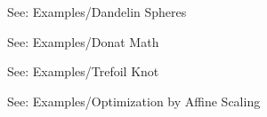 \documentclass[a4paper,10pt]{article}
\begin{document}
\begin{eulernotebook}
\begin{eulercomment}
See: Examples/Dandelin Spheres

See: Examples/Donat Math

See: Examples/Trefoil Knot

See: Examples/Optimization by Affine Scaling
\end{eulercomment}
\end{eulernotebook}
\end{document}
